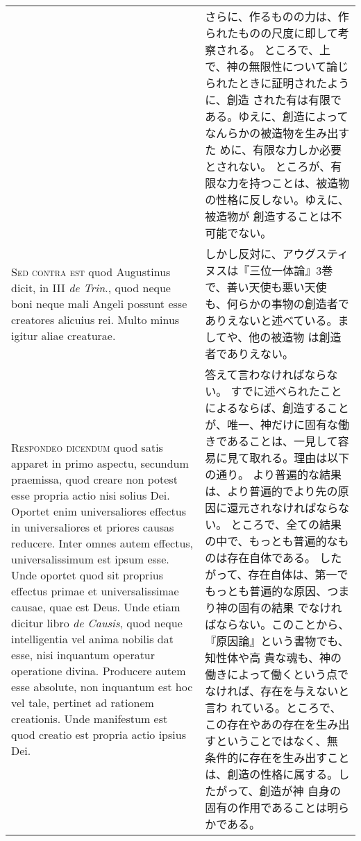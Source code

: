 \documentclass[10pt]{jsarticle} %
\begin{document}
\begin{longtable}{p{21em}p{21em}}
&

さらに、作るものの力は、作られたものの尺度に即して考察される。
ところで、上で、神の無限性について論じられたときに証明されたように、創造
 された有は有限である。ゆえに、創造によってなんらかの被造物を生み出すた
 めに、有限な力しか必要とされない。
ところが、有限な力を持つことは、被造物の性格に反しない。ゆえに、被造物が
 創造することは不可能でない。

\\


{\scshape Sed contra est} quod Augustinus dicit, in III
 {\itshape de Trin}., quod neque boni neque mali Angeli possunt esse creatores
 alicuius rei. Multo minus igitur aliae creaturae.

&

しかし反対に、アウグスティヌスは『三位一体論』3巻で、善い天使も悪い天使
 も、何らかの事物の創造者でありえないと述べている。ましてや、他の被造物
 は創造者でありえない。

\\


{\scshape Respondeo dicendum} quod satis apparet in primo
 aspectu, secundum praemissa, quod creare non potest esse propria actio
 nisi solius Dei. Oportet enim universaliores effectus in universaliores
 et priores causas reducere. Inter omnes autem effectus,
 universalissimum est ipsum esse. Unde oportet quod sit proprius
 effectus primae et universalissimae causae, quae est Deus. Unde etiam
 dicitur libro {\itshape de Causis}, quod neque intelligentia vel anima nobilis dat
 esse, nisi inquantum operatur operatione divina. Producere autem esse
 absolute, non inquantum est hoc vel tale, pertinet ad rationem
 creationis. Unde manifestum est quod creatio est propria actio ipsius
 Dei. 


&

答えて言わなければならない。
すでに述べられたことによるならば、創造することが、唯一、神だけに固有な働
 きであることは、一見して容易に見て取れる。理由は以下の通り。
より普遍的な結果は、より普遍的でより先の原因に還元されなければならない。
ところで、全ての結果の中で、もっとも普遍的なものは存在自体である。
したがって、存在自体は、第一でもっとも普遍的な原因、つまり神の固有の結果
 でなければならない。このことから、『原因論』という書物でも、知性体や高
 貴な魂も、神の働きによって働くという点でなければ、存在を与えないと言わ
 れている。ところで、この存在やあの存在を生み出すということではなく、無
 条件的に存在を生み出すことは、創造の性格に属する。したがって、創造が神
 自身の固有の作用であることは明らかである。



\end{longtable}
\end{document}
